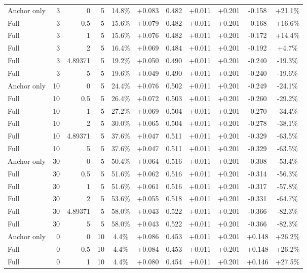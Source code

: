 \begin{table}[htbp]
\begin{tabular}{lrrrccccccc}
Anchor only & 3 & 0 & 5 & 14.8\% & +0.083 & 0.482 & +0.011 & +0.201 & -0.158 & +21.1\% \\
Full & 3 & 0.5 & 5 & 15.6\% & +0.079 & 0.482 & +0.011 & +0.201 & -0.168 & +16.6\% \\
Full & 3 & 1 & 5 & 15.6\% & +0.076 & 0.482 & +0.011 & +0.201 & -0.172 & +14.4\% \\
Full & 3 & 2 & 5 & 16.4\% & +0.069 & 0.484 & +0.011 & +0.201 & -0.192 & +4.7\% \\
Full & 3 & 4.89371 & 5 & 19.2\% & +0.050 & 0.490 & +0.011 & +0.201 & -0.240 & -19.3\% \\
Full & 3 & 5 & 5 & 19.6\% & +0.049 & 0.490 & +0.011 & +0.201 & -0.240 & -19.6\% \\
Anchor only & 10 & 0 & 5 & 24.4\% & +0.076 & 0.502 & +0.011 & +0.201 & -0.249 & -24.1\% \\
Full & 10 & 0.5 & 5 & 26.4\% & +0.072 & 0.503 & +0.011 & +0.201 & -0.260 & -29.2\% \\
Full & 10 & 1 & 5 & 27.2\% & +0.069 & 0.504 & +0.011 & +0.201 & -0.270 & -34.4\% \\
Full & 10 & 2 & 5 & 30.0\% & +0.065 & 0.504 & +0.011 & +0.201 & -0.278 & -38.1\% \\
Full & 10 & 4.89371 & 5 & 37.6\% & +0.047 & 0.511 & +0.011 & +0.201 & -0.329 & -63.5\% \\
Full & 10 & 5 & 5 & 37.6\% & +0.047 & 0.511 & +0.011 & +0.201 & -0.329 & -63.5\% \\
Anchor only & 30 & 0 & 5 & 50.4\% & +0.064 & 0.516 & +0.011 & +0.201 & -0.308 & -53.4\% \\
Full & 30 & 0.5 & 5 & 51.6\% & +0.062 & 0.516 & +0.011 & +0.201 & -0.314 & -56.3\% \\
Full & 30 & 1 & 5 & 51.6\% & +0.061 & 0.516 & +0.011 & +0.201 & -0.317 & -57.8\% \\
Full & 30 & 2 & 5 & 53.6\% & +0.055 & 0.518 & +0.011 & +0.201 & -0.331 & -64.7\% \\
Full & 30 & 4.89371 & 5 & 58.0\% & +0.043 & 0.522 & +0.011 & +0.201 & -0.366 & -82.3\% \\
Full & 30 & 5 & 5 & 58.0\% & +0.043 & 0.522 & +0.011 & +0.201 & -0.366 & -82.3\% \\
Anchor only & 0 & 0 & 10 & 4.4\% & +0.086 & 0.453 & +0.011 & +0.201 & +0.148 & +26.2\% \\
Full & 0 & 0.5 & 10 & 4.4\% & +0.084 & 0.453 & +0.011 & +0.201 & +0.148 & +26.2\% \\
Full & 0 & 1 & 10 & 4.4\% & +0.080 & 0.454 & +0.011 & +0.201 & +0.146 & +27.5\% \\

\end{tabular}
\end{table}
